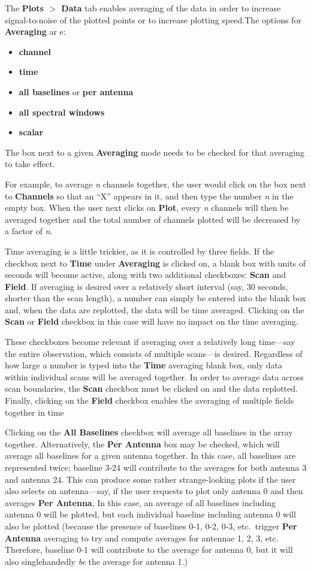 The {\bf Plots $>$ Data} tab enables averaging of the data in order to increase signal-to-noise of the plotted points or to increase plotting speed.The options for {\bf Averaging} ar e: 
\begin{itemize}
   \item {\bf channel}
   \item {\bf time}
   \item {\bf all baselines} or {\bf per antenna}
   \item {\bf all spectral windows}
   \item {\bf scalar}
\end{itemize}
The box next to a given {\bf Averaging} mode needs to be checked for that averaging to take effect.

For example, to average {\it n} channels together, the user would click on the box next to {\bf Channels} so that an ``X'' appears in it, and then type the number {\it n} in the empty box. When the user next clicks on {\bf Plot}, every {\it n} channels will then be averaged together and the total number of channels plotted will be decreased by a factor of {\it n}.

Time averaging is a little trickier, as it is controlled by three fields. If the checkbox next to {\bf Time} under {\bf Averaging} is clicked on, a blank box with units of seconds will become active, along with two additional checkboxes: {\bf Scan} and {\bf Field}. If averaging is desired over a relatively short interval (say, 30 seconds, shorter than the scan length), a number can simply be entered into the blank box and, when the data are replotted, the data will be time averaged. Clicking on the {\bf Scan} or {\bf Field} checkbox in this case will have no impact on the time averaging.

These checkboxes become relevant if averaging over a relatively long time---say the entire observation, which consists of multiple scans---is desired. Regardless of how large a number is typed into the {\bf Time} averaging blank box, only data within individual scans will be averaged together. In order to average data across scan boundaries, the {\bf Scan} checkbox must be clicked on and the data replotted. Finally, clicking on the {\bf Field} checkbox enables the averaging of multiple fields together in time

Clicking on the {\bf All Baselines} checkbox will average all baselines in the array together. Alternatively, the {\bf Per Antenna} box  may be checked, which will average all baselines for a given antenna together. In this case, all baselines are represented twice; baseline 3-24 will contribute to the averages for both antenna 3 and antenna 24. This can produce some rather strange-looking plots if the user also selects on antenna---say, if the user requests to plot only antenna 0 and then averages {\bf Per Antenna}, In this case, an average of all baselines including antenna 0 will be plotted, but each individual baseline including antenna 0 will also be plotted (because the presence of baselines 0-1, 0-2, 0-3, etc.~trigger {\bf Per Antenna} averaging to try and compute averages for antennae 1, 2, 3, etc. Therefore, baseline 0-1 will contribute to the average for antenna 0, but it will also singlehandedly {\it be} the average for antenna 1.) 

